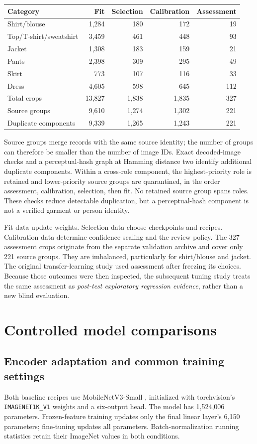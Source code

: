 \begin{center}\small
\begin{tabular}{lrrrr}\toprule
Category & Fit & Selection & Calibration & Assessment\\\midrule
Shirt/blouse & 1,284 & 180 & 172 & 19\\
Top/T-shirt/sweatshirt & 3,459 & 461 & 448 & 93\\
Jacket & 1,308 & 183 & 159 & 21\\
Pants & 2,398 & 309 & 295 & 49\\
Skirt & 773 & 107 & 116 & 33\\
Dress & 4,605 & 598 & 645 & 112\\\midrule
Total crops & 13,827 & 1,838 & 1,835 & 327\\
Source groups & 9,610 & 1,274 & 1,302 & 221\\
Duplicate components & 9,339 & 1,265 & 1,243 & 221\\\bottomrule
\end{tabular}\end{center}
Source groups merge records with the same source identity; the number of groups can therefore be smaller than the number of image IDs. Exact decoded-image checks and a perceptual-hash graph at Hamming distance two identify additional duplicate components. Within a cross-role component, the highest-priority role is retained and lower-priority source groups are quarantined, in the order assessment, calibration, selection, then fit. No retained source group spans roles. These checks reduce detectable duplication, but a perceptual-hash component is not a verified garment or person identity.

Fit data update weights. Selection data choose checkpoints and recipes. Calibration data determine confidence scaling and the review policy. The 327 assessment crops originate from the separate validation archive and cover only 221 source groups. They are imbalanced, particularly for shirt/blouse and jacket. The original transfer-learning study used assessment after freezing its choices. Because those outcomes were then inspected, the subsequent tuning study treats the same assessment as \emph{post-test exploratory regression evidence}, rather than a new blind evaluation.

\clearpage
\section{Controlled model comparisons}\label{sec:garmentlab-v2}
\subsection{Encoder adaptation and common training settings}
Both baseline recipes use MobileNetV3-Small \cite{mobilenetv3}, initialized with torchvision's \texttt{IMAGENET1K\_V1} weights and a six-output head. The model has 1,524,006 parameters. Frozen-feature training updates only the final linear layer's 6,150 parameters; fine-tuning updates all parameters. Batch-normalization running statistics retain their ImageNet values in both conditions.

